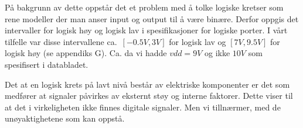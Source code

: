    På bakgrunn av dette oppstår det et problem med å tolke logiske kretser som rene modeller der man anser input og output til å være binære.
    Derfor oppgis det intervaller for logisk høy og logisk lav i spesifikasjoner for logiske porter.
    I vårt tilfelle var disse intervallene ca.\ $[-0.5V, 3V]$ for logisk lav og $[7V, 9.5V]$ for logisk høy (se appendiks G).
    Ca. da vi hadde $vdd=9V$ og ikke $10V$ som spesifisert i databladet.

    Det at en logisk krets på lavt nivå består av elektriske komponenter er det som medfører at signaler påvirkes av eksternt støy og interne faktorer.
    Dette viser til at det i virkeligheten ikke finnes digitale signaler.
    Men vi tillnærmer, med de unøyaktighetene som kan oppstå.
